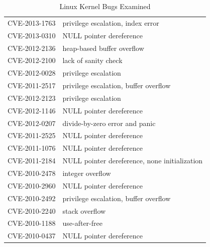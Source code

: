 \begin{table}[!ht]
\begin{tabular}{|l|l|}
 CVE-2013-1763 \cite{CVE:20131763} & privilege escalation, index error \\
 CVE-2013-0310 \cite{CVE:20130310} & NULL pointer dereference \\
 CVE-2012-2136 \cite{CVE:20122136} & heap-based buffer overflow \\
 CVE-2012-2100 \cite{CVE:20122100} & lack of sanity check \\
 CVE-2012-0028 \cite{CVE:20120028} & privilege escalation \\
 CVE-2011-2517 \cite{CVE:20112517} & privilege escalation, buffer overflow \\
 CVE-2012-2123 \cite{CVE:20122123} & privilege escalation \\
 CVE-2012-1146 \cite{CVE:20121146} & NULL pointer dereference \\
 CVE-2012-0207 \cite{CVE:20120207} & divide-by-zero error and panic \\
 CVE-2011-2525 \cite{CVE:20112525} & NULL pointer dereference \\
 CVE-2011-1076 \cite{CVE:20111076} & NULL pointer dereference \\
 CVE-2011-2184 \cite{CVE:20112184} & NULL pointer dereference, none initialization\\
 CVE-2010-2478 \cite{CVE:20102478} & integer overflow \\
 CVE-2010-2960 \cite{CVE:20102960} & NULL pointer dereference  \\
 CVE-2010-2492 \cite{CVE:20102492} & privilege escalation, buffer overflow \\
 CVE-2010-2240 \cite{CVE:20102240} & stack overflow \\
 CVE-2010-1188 \cite{CVE:20101188} & use-after-free \\
 CVE-2010-0437 \cite{CVE:20100437} & NULL pointer dereference \\
\hline
\end{tabular}
\caption {Linux Kernel Bugs Examined}
\label{table:kernel_bugs}
\end{table}

